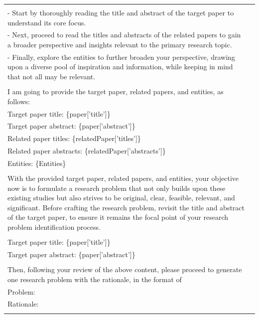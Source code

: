 \documentclass[11pt]{article}
\begin{document}
\begin{table}
{\begin{tabular}{ll}
{            \multicolumn{1}{p{.92\textwidth}}{{Your approach should be systematic:}} \\ 
            \multicolumn{1}{p{.92\textwidth}}{{- Start by thoroughly reading the title and abstract of the target paper to understand its core focus.}} \\
            \multicolumn{1}{p{.92\textwidth}}{{- Next, proceed to read the titles and abstracts of the related papers to gain a broader perspective and insights relevant to the primary research topic.}} \\
            \multicolumn{1}{p{.92\textwidth}}{{- Finally, explore the entities to further broaden your perspective, drawing upon a diverse pool of inspiration and information, while keeping in mind that not all may be relevant.}} \\ \\
            \multicolumn{1}{p{.92\textwidth}}{{I am going to provide the target paper, related papers, and entities, as follows: }} \\
            \multicolumn{1}{p{.92\textwidth}}{{Target paper title: \{paper['title']\}}} \\
            \multicolumn{1}{p{.92\textwidth}}{{Target paper abstract: \{paper['abstract']\} }} \\
            \multicolumn{1}{p{.92\textwidth}}{{Related paper titles: \{relatedPaper['titles']\}}} \\
            \multicolumn{1}{p{.92\textwidth}}{{Related paper abstracts: \{relatedPaper['abstracts']\} }} \\
            \multicolumn{1}{p{.92\textwidth}}{{Entities: \{Entities\} }} \\ \\
            \multicolumn{1}{p{.92\textwidth}}{{With the provided target paper, related papers, and entities, your objective now is to formulate a research problem that not only builds upon these existing studies but also strives to be original, clear, feasible, relevant, and significant. Before crafting the research problem, revisit the title and abstract of the target paper, to ensure it remains the focal point of your research problem identification process.}} \\ \\
            \multicolumn{1}{p{.92\textwidth}}{{Target paper title: \{paper['title']\}}} \\
            \multicolumn{1}{p{.92\textwidth}}{{Target paper abstract: \{paper['abstract']\} }} \\ \\
            \multicolumn{1}{p{.92\textwidth}}{{Then, following your review of the above content, please proceed to generate one research problem with the rationale, in the format of }} \\
            \multicolumn{1}{p{.92\textwidth}}{{Problem: }} \\
            \multicolumn{1}{p{.92\textwidth}}{{Rationale: }} \\
        } \\
        \bottomrule
        \end{tabular}
    }
\end{table}
\end{document}
